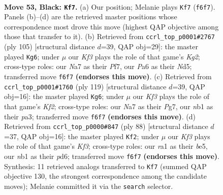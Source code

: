 \documentclass[11pt]{article}
\begin{document}
\clearpage

\begin{figure}[p]\centering
\begin{subfigure}{0.46\textwidth}\centering
\resizebox{\linewidth}{!}{%
\newchessgame
\chessboard[
  setfen={7K/n1P5/p4k2/P4p1p/4pB2/5bP1/8/RN1r4 b - - 13 53},
  showmover=false,
  pgfstyle=straightmove, color=movearrow, markmove={f6-f7}
]}
\caption{}
\end{subfigure}\hfill
\begin{subfigure}{0.46\textwidth}\centering
\resizebox{\linewidth}{!}{%
\newchessgame
\chessboard[
  setfen={8/5pk1/1r2p2p/1Nbn4/5P1P/1R4P1/4B1K1/8 b - - 12 53},
  showmover=false,
  pgfstyle=straightmove, color=movearrow, markmove={g7-g6}
]}
\caption{}
\end{subfigure}
\\[4pt]
\begin{subfigure}{0.46\textwidth}\centering
\resizebox{\linewidth}{!}{%
\newchessgame
\chessboard[
  setfen={8/5kp1/5p2/3b3p/1B3P1P/P1R3P1/r7/4K3 b - - 32 60},
  showmover=false,
  pgfstyle=straightmove, color=movearrow, markmove={f7-g6}
]}
\caption{}
\end{subfigure}\hfill
\begin{subfigure}{0.46\textwidth}\centering
\resizebox{\linewidth}{!}{%
\newchessgame
\chessboard[
  setfen={8/r4pk1/2Rp4/3Bb1pP/4P1P1/5K2/8/8 w - - 5 45},
  showmover=false,
  pgfstyle=straightmove, color=movearrow, markmove={f3-f2}
]}
\caption{}
\end{subfigure}
\caption{\textbf{Move 53, Black: \texttt{Kf7}.} (a) Our position; Melanie plays \texttt{Kf7} (\texttt{f6f7}). Panels (b)--(d) are the retrieved master positions whose correspondence most drove this move (highest QAP objective among those that transfer to it). (b) Retrieved from \texttt{ccrl\_top\_p0001\#2767} (ply 105) [structural distance $d$=39, QAP obj=29]: the master played \texttt{Kg6}; under $\mu$ our \emph{Kf3} plays the role of that game's \emph{Kg2}; cross-type roles: our \emph{N}a7 as their \emph{P}f7, our \emph{P}a6 as their \emph{N}d5; transferred move \texttt{f6f7} \textbf{(endorses this move)}. (c) Retrieved from \texttt{ccrl\_top\_p0001\#1760} (ply 119) [structural distance $d$=39, QAP obj=16]: the master played \texttt{Kg6}; under $\mu$ our \emph{Kf3} plays the role of that game's \emph{Kf2}; cross-type roles: our \emph{N}a7 as their \emph{P}g7, our \emph{n}b1 as their \emph{p}a3; transferred move \texttt{f6f7} \textbf{(endorses this move)}. (d) Retrieved from \texttt{ccrl\_top\_p0000\#847} (ply 88) [structural distance $d$=37, QAP obj=16]: the master played \texttt{Kf2}; under $\mu$ our \emph{Kf3} plays the role of that game's \emph{Kf3}; cross-type roles: our \emph{r}a1 as their \emph{b}e5, our \emph{n}b1 as their \emph{p}d6; transferred move \texttt{f6f7} \textbf{(endorses this move)}. Synthesis: 11 retrieved analogs transferred to \texttt{Kf7} (summed QAP objective 130, the strongest correspondence among the candidate moves); Melanie committed it via the \texttt{search} selector.}
\label{fig:thought-m105}
\end{figure}
\end{document}

